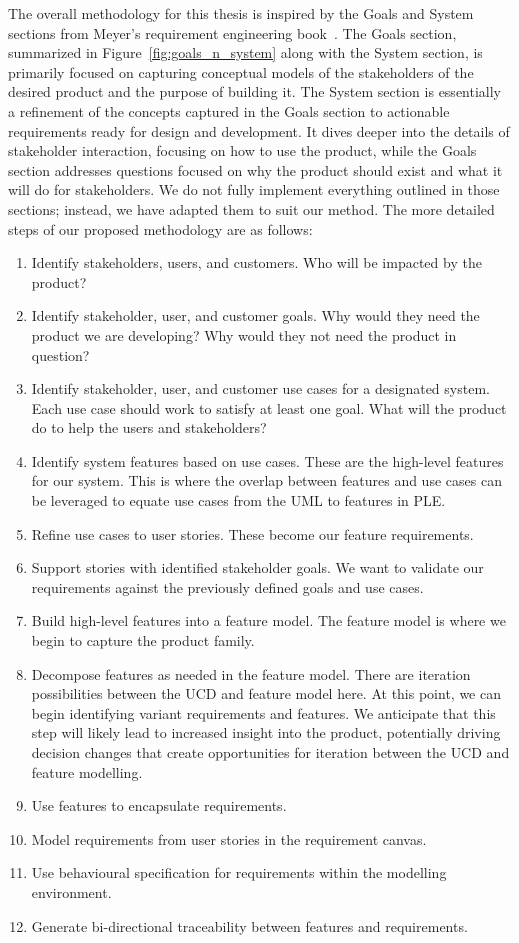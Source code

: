 The overall methodology for this thesis is inspired by the Goals and System sections from Meyer's requirement engineering book~\cite{meyer2022handbook}. The Goals section, summarized in Figure~\ref{fig:goals_n_system} along with the System section, is primarily focused on capturing conceptual models of the stakeholders of the desired product and the purpose of building it. The System section is essentially a refinement of the concepts captured in the Goals section to actionable requirements ready for design and development. It dives deeper into the details of stakeholder interaction, focusing on how to use the product, while the Goals section addresses questions focused on why the product should exist and what it will do for stakeholders. We do not fully implement everything outlined in those sections; instead, we have adapted them to suit our method. The more detailed steps of our proposed methodology are as follows:
\begin{enumerate}
	\item Identify stakeholders, users, and customers. Who will be impacted by the product?
	\item Identify stakeholder, user, and customer goals. Why would they need the product we are developing? Why would they not need the product in question?
	\item Identify stakeholder, user, and customer use cases for a designated system. Each use case should work to satisfy at least one goal. What will the product do to help the users and stakeholders?
	\item Identify system features based on use cases. These are the high-level features for our system. This is where the overlap between features and use cases can be leveraged to equate use cases from the \gls{UML} to features in \gls{PLE}.
	\item Refine use cases to user stories. These become our feature requirements.
	\item Support stories with identified stakeholder goals. We want to validate our requirements against the previously defined goals and use cases.
	\item Build high-level features into a feature model. The feature model is where we begin to capture the product family.
	\item Decompose features as needed in the feature model. There are iteration possibilities between the \gls{UCD} and feature model here. At this point, we can begin identifying variant requirements and features. We anticipate that this step will likely lead to increased insight into the product, potentially driving decision changes that create opportunities for iteration between the \gls{UCD} and feature modelling.
	\item Use features to encapsulate requirements.
	\item Model requirements from user stories in the requirement canvas.
	\item Use behavioural specification for requirements within the modelling environment.
	\item Generate bi-directional traceability between features and requirements.
\end{enumerate}

